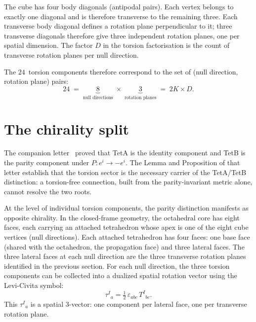 \documentclass[twocolumn]{iopjournal}
\begin{document}
The cube has four body diagonals (antipodal pairs).
Each vertex belongs to exactly one diagonal and is
therefore transverse to the remaining three.  Each
transverse body diagonal defines a rotation plane
perpendicular to it; three transverse diagonals
therefore give three independent rotation planes, one
per spatial dimension.  The factor $D$ in
the torsion factorisation is the count of transverse
rotation planes per null direction.

The $24$~torsion components therefore correspond to
the set of (null direction, rotation plane) pairs:
\begin{equation}
  24 \;=\; \underbrace{8}_{\text{null directions}}
        \;\times\; \underbrace{3}_{\text{rotation planes}}
  \;=\; 2K \times D.
  \label{eq:24}
\end{equation}


\section*{The chirality split}

The companion letter~\cite{Nelson2026b} proved that
TetA is the identity component and TetB is the parity
component under $P: e^i \to -e^i$.  The
Lemma and Proposition of that letter establish that the
torsion sector is the necessary carrier of the TetA/TetB
distinction: a torsion-free connection, built from the
parity-invariant metric alone, cannot resolve the two
roots.

At the level of individual torsion components, the
parity distinction manifests as opposite chirality.
In the closed-frame geometry, the octahedral core has
eight faces, each carrying an attached tetrahedron
whose apex is one of the eight cube vertices (null
directions).  Each attached tetrahedron has four faces:
one base face (shared with the octahedron, the
propagation face) and three lateral faces.  The three
lateral faces at each null direction are the three
transverse rotation planes identified in the previous
section.  For each null direction, the three torsion
components can be collected into a dualized spatial
rotation vector using the Levi-Civita symbol:
\begin{equation}
  \tau^I{}_a = \tfrac{1}{2}\,
    \varepsilon_{abc}\, T^I{}_{bc}.
  \label{eq:dual}
\end{equation}
This $\tau^I{}_a$ is a spatial 3-vector: one component
per lateral face, one per transverse rotation plane.
\end{document}
